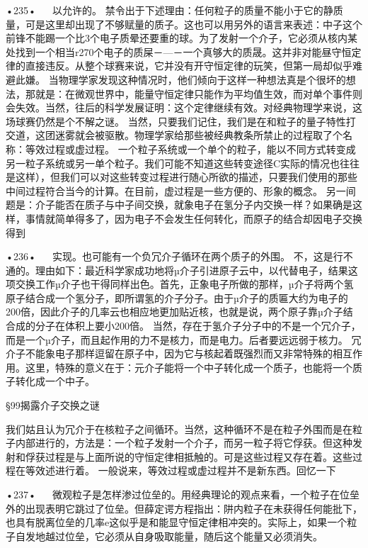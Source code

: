 •235•
  
以允许的。
禁令出于下述理由：任何粒子的质量不能小于它的静质量，可是这里却出现了不够赋量的质子。这也可以用另外的语言来表述：中子这个前锋不能踢一个比3个电子质晕还要重的球。为了发射一个介子，它必须从核内某处找到一个相当r270个电子的质屎－—－一个真够大的质晟。这并非对能昼守恒定律的直接违反。从整个球赛来说，它并没有开守恒定律的玩笑，但第一局却似乎难避此嫌。
当物理学家发现这种情况时，他们倾向于这样一种想法真是个很坏的想法，那就是：在微观世界中，能量守恒定律只能作为平均值生效，而对单个事件则会失效。当然，往后的科学发展证明：这个定律继续有效。对经典物理学来说，这场球赛仍然是个不解之谜。
当然，只要我们记住，我们是在和粒子的量子特性打交道，这团迷雾就会被驱散。物理学家给那些被经典教条所禁止的过程取了个名称：等效过程或虚过程。
一个粒子系统或一个单个的粒子，能以不同方式转变成另一粒子系统或另一单个粒子。我们可能不知道这些转变途径C实际的情况也往往是这样），但我们可以对这些转变过程进行随心所欲的描述，只要我们使用的那些中间过程符合当今的计算。在目前，虚过程是一些方便的、形象的概念。
另一间题是：介子能否在质子与中子间交换，就象电子在氢分子内交换一样？如果确是这样，事情就简单得多了，因为电子不会发生任何转化，而原子的结合却因电子交换得到

•236•
  
实现。也可能有一个负冗介子循环在两个质子的外围。
不，这是行不通的。理由如下：最近科学家成功地将µ介子引进原子云中，以代替电子，结果这项交换工作µ介子也干得同样出色。首先，正象电子所做的那样，µ介子将两个氢原子结合成一个氢分子，即所谓氢的介子分子。由于µ介子的质匾大约为电子的200倍，因此介子的几率云也相应地更加贴近核，也就是说，两个原子靠µ介子结合成的分子在体积上要小200倍。
当然，存在于氢介子分子中的不是一个冗介子，而是一个µ介子，而且起作用的力不是核力，而是电力。后者要远远弱于核力。
冗介子不能象电子那样逗留在原子中，因为它与核起着既强烈而又非常特殊的相互作用。这里，特殊的意义在于：元介子能将一个中子转化成一个质子，也能将一个质子转化成一个中子。

§99揭露介子交换之谜

我们姑且认为冗介于在核粒子之间循环。当然，这种循环不是在粒子外围而是在粒子内部进行的，方法是：一个粒子发射一个介子，而另一粒子将它俘获。但这种发射和俘获过程是与上面所说的守恒定律相抵触的。可是这些过程又存在着。这些过程在等效述进行着。
一般说来，等效过程或虚过程并不是新东西。回忆一下

•237•
  
微观粒子是怎样渗过位垒的。用经典理论的观点来看，一个粒子在位垒外的出现表明它跳过了位垒。但薛定谔方程指出：阱内粒子在未获得任何能批下，也具有脱离位垒的几率e这似乎是和能显守恒定律相冲突的。实际上，如果一个粒子自发地越过位垒，它必须从自身吸取能量，随后这个能量又必须消失。

